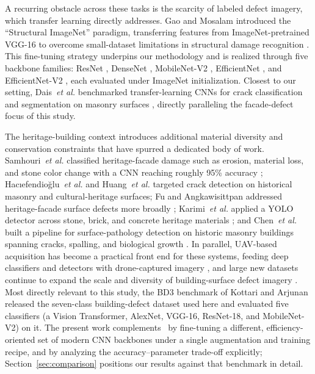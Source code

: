\documentclass[ASNA, twocolumn]{USG}
\begin{document}
A recurring obstacle across these tasks is the scarcity of labeled defect imagery, which transfer learning directly addresses. Gao and Mosalam introduced the ``Structural ImageNet'' paradigm, transferring features from ImageNet-pretrained VGG-16 \cite{ref23} to overcome small-dataset limitations in structural damage recognition \cite{ref22}. This fine-tuning strategy underpins our methodology and is realized through five backbone families: ResNet \cite{ref24}, DenseNet \cite{ref25}, MobileNet-V2 \cite{ref26}, EfficientNet \cite{ref27}, and EfficientNet-V2 \cite{ref28}, each evaluated under ImageNet initialization. Closest to our setting, Dais~\textit{et al.} benchmarked transfer-learning CNNs for crack classification and segmentation on masonry surfaces \cite{ref29}, directly paralleling the facade-defect focus of this study.

The heritage-building context introduces additional material diversity and conservation constraints that have spurred a dedicated body of work. Samhouri~\textit{et al.} classified heritage-facade damage such as erosion, material loss, and stone color change with a CNN reaching roughly 95\% accuracy \cite{ref30}; Hacıefendioğlu~\textit{et al.} \cite{ref31} and Huang~\textit{et al.} \cite{ref34} targeted crack detection on historical masonry and cultural-heritage surfaces; Fu and Angkawisittpan addressed heritage-facade surface defects more broadly \cite{ref32}; Karimi~\textit{et al.} applied a YOLO detector across stone, brick, and concrete heritage materials \cite{ref33}; and Chen~\textit{et al.} built a pipeline for surface-pathology detection on historic masonry buildings spanning cracks, spalling, and biological growth \cite{ref35}. In parallel, UAV-based acquisition has become a practical front end for these systems, feeding deep classifiers and detectors with drone-captured imagery \cite{ref36,ref37,ref38}, and large new datasets continue to expand the scale and diversity of building-surface defect imagery \cite{ref39}. Most directly relevant to this study, the BD3 benchmark of Kottari and Arjunan~\cite{ref40} released the seven-class building-defect dataset used here and evaluated five classifiers (a Vision Transformer, AlexNet, VGG-16, ResNet-18, and MobileNet-V2) on it. The present work complements~\cite{ref40} by fine-tuning a different, efficiency-oriented set of modern CNN backbones under a single augmentation and training recipe, and by analyzing the accuracy--parameter trade-off explicitly; Section~\ref{sec:comparison} positions our results against that benchmark in detail.
\end{document}
